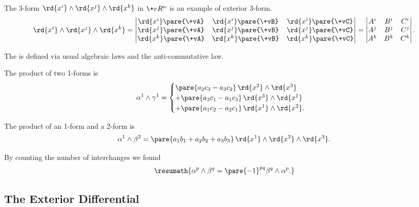 \documentclass[hidelinks]{article}
\let\oldgloss\gloss
\def\gloss#1{\textbf{\oldgloss{#1}}}
\begin{document}
\begin{ex}
    The 3-form $\rd{x^i}\wedge \rd{x^j}\wedge \rd{x^k}$ in $\+vR^n$ is an example of exterior 3-form.
    \[ \rd{x^i}\wedge \rd{x^j}\wedge \rd{x^k} = \begin{vmatrix}
        \rd{x^i}\pare{\+vA} & \rd{x^i}\pare{\+vB} & \rd{x^i}\pare{\+vC} \\
        \rd{x^j}\pare{\+vA} & \rd{x^j}\pare{\+vB} & \rd{x^j}\pare{\+vC} \\
        \rd{x^k}\pare{\+vA} & \rd{x^k}\pare{\+vB} & \rd{x^k}\pare{\+vC}
    \end{vmatrix} = \begin{vmatrix}
        A^i & B^i & C^i \\
        A^j & B^j & C^j \\
        A^k & B^k & C^k
    \end{vmatrix}. \]
\end{ex}

\par
The  is defined via usual algebraic laws and the anti-commutative law.
\begin{ex}
    The product of two 1-forms is
    \[ \alpha^1\wedge \gamma^1 = \begin{cases}
        \pare{a_2c_3 - a_3c_2}\,\rd{x^2}\wedge \rd{x^3} \\
        + \pare{a_3c_1 - a_1c_3}\,\rd{x^3}\wedge \rd{x^1} \\
        + \pare{a_1c_2 - a_2c_1}\,\rd{x^1}\wedge \rd{x^2}.
    \end{cases} \]
\end{ex}
\begin{ex}
    The product of an 1-form and a 2-form is
    \[ \alpha^1\wedge\beta^2 = \pare{a_1b_1 + a_2b_2 + a_3b_3}\,\rd{x^1}\wedge \rd{x^2}\wedge \rd{x^3}. \]
\end{ex}
By counting the number of interchanges we found
\[ \resumath{\alpha^p \wedge \beta^q = \pare{-1}^{pq}\beta^q \wedge \alpha^p.} \]


\subsection{The Exterior Differential} %
\label{sub:the_exterior_differential}
\end{document}
